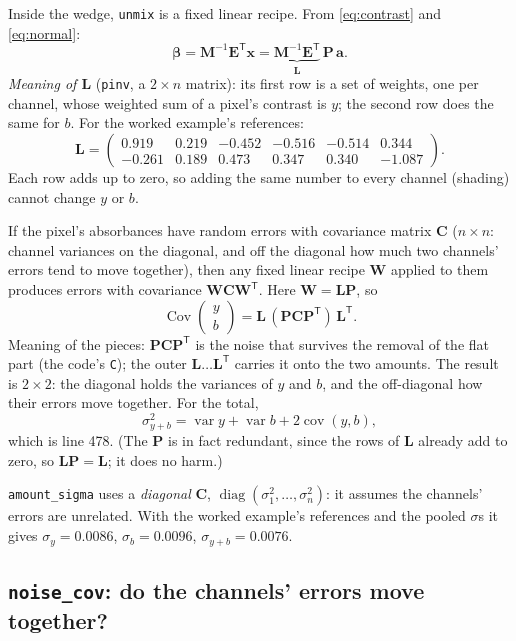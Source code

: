 \documentclass[11pt,letterpaper]{article}
\newcommand{\code}[1]{\texttt{#1}}
\newcommand{\va}{\mathbf{a}}
\newcommand{\vx}{\mathbf{x}}
\newcommand{\mP}{\mathbf{P}}
\newcommand{\mE}{\mathbf{E}}
\newcommand{\mM}{\mathbf{M}}
\newcommand{\mL}{\mathbf{L}}
\newcommand{\mC}{\mathbf{C}}
\newcommand{\T}{^{\mathsf{T}}}
\newcommand{\inv}{^{-1}}
\begin{document}
Inside the wedge, \code{unmix} is a fixed linear recipe.  From
\eqref{eq:contrast} and \eqref{eq:normal}:
\begin{equation}
\bm\beta = \mM\inv\mE\T\vx = \underbrace{\mM\inv\mE\T}_{\mL}\,\mP\,\va .
\end{equation}
\emph{Meaning of $\mL$} (\code{pinv}, a $2\times n$ matrix): its first row is
a set of weights, one per channel, whose weighted sum of a pixel's contrast
is $y$; the second row does the same for $b$.  For the worked example's
references:
\[
\mL = \begin{pmatrix}
0.919 & 0.219 & -0.452 & -0.516 & -0.514 & 0.344\\
-0.261 & 0.189 & 0.473 & 0.347 & 0.340 & -1.087
\end{pmatrix}.
\]
Each row adds up to zero, so adding the same number to every channel
(shading) cannot change $y$ or $b$.

If the pixel's absorbances have random errors with covariance matrix $\mC$
($n\times n$: channel variances on the diagonal, and off the diagonal how
much two channels' errors tend to move together), then any fixed linear
recipe $\mathbf W$ applied to them produces errors with covariance
$\mathbf W\mC\mathbf W\T$.  Here $\mathbf W = \mL\mP$, so
\begin{equation}
\operatorname{Cov}\begin{pmatrix}y\\b\end{pmatrix}
= \mL\,(\mP\mC\mP\T)\,\mL\T .
\label{eq:sandwich}
\end{equation}
Meaning of the pieces: $\mP\mC\mP\T$ is the noise that survives the removal
of the flat part (the code's \code{C}); the outer $\mL \dots \mL\T$ carries
it onto the two amounts.  The result is $2\times2$: the diagonal holds the
variances of $y$ and $b$, and the off-diagonal how their errors move
together.  For the total,
\[
\sigma_{y+b}^2 = \operatorname{var} y + \operatorname{var} b +
2\operatorname{cov}(y, b),
\]
which is line 478.  (The $\mP$ is in fact redundant, since the rows of $\mL$
already add to zero, so $\mL\mP = \mL$; it does no harm.)

\code{amount\_sigma} uses a \emph{diagonal} $\mC$, $\operatorname{diag}
(\sigma_1^2, \dots, \sigma_n^2)$: it assumes the channels' errors are
unrelated.  With the worked example's references and the pooled $\sigma$s
it gives $\sigma_y = 0.0086$, $\sigma_b = 0.0096$, $\sigma_{y+b} = 0.0076$.

\subsection{\code{noise\_cov}: do the channels' errors move together?}
\end{document}
